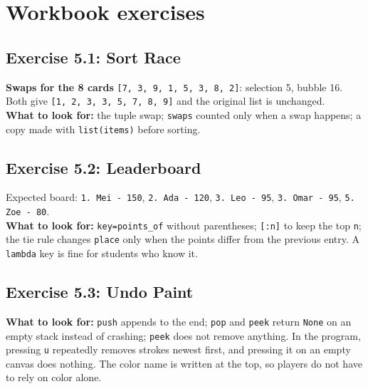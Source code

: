 
\section{Workbook exercises}
\subsection{Exercise 5.1: Sort Race}
\begin{answer}
\textbf{Swaps for the 8 cards} \texttt{[7, 3, 9, 1, 5, 3, 8, 2]}: selection 5, bubble 16. Both give \texttt{[1, 2, 3, 3, 5, 7, 8, 9]} and the original list is unchanged.\\
\textbf{What to look for:} the tuple swap; \texttt{swaps} counted only when a swap happens; a copy made with \texttt{list(items)} before sorting.
\end{answer}

\subsection{Exercise 5.2: Leaderboard}
\begin{answer}
Expected board: \texttt{1. Mei - 150}, \texttt{2. Ada - 120}, \texttt{3. Leo - 95}, \texttt{3. Omar - 95}, \texttt{5. Zoe - 80}.\\
\textbf{What to look for:} \texttt{key=points\_of} without parentheses; \texttt{[:n]} to keep the top \texttt{n}; the tie rule changes \texttt{place} only when the points differ from the previous entry. A \texttt{lambda} key is fine for students who know it.
\end{answer}

\subsection{Exercise 5.3: Undo Paint}
\begin{answer}
\textbf{What to look for:} \texttt{push} appends to the end; \texttt{pop} and \texttt{peek} return \texttt{None} on an empty stack instead of crashing; \texttt{peek} does not remove anything.
In the program, pressing \texttt{u} repeatedly removes strokes newest first, and pressing it on an empty canvas does nothing.
The color name is written at the top, so players do not have to rely on color alone.
\end{answer}

